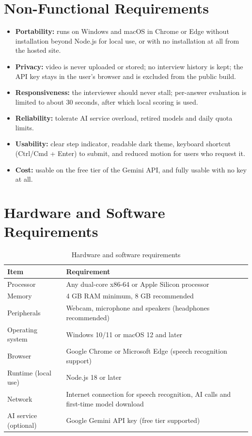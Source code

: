 \documentclass[12pt,a4paper,oneside]{report}
\begin{document}
\section{Non-Functional Requirements}
\begin{itemize}
  \item \textbf{Portability:} runs on Windows and macOS in Chrome or Edge without installation beyond Node.js for local use, or with no installation at all from the hosted site.
  \item \textbf{Privacy:} video is never uploaded or stored; no interview history is kept; the API key stays in the user's browser and is excluded from the public build.
  \item \textbf{Responsiveness:} the interviewer should never stall; per-answer evaluation is limited to about 30 seconds, after which local scoring is used.
  \item \textbf{Reliability:} tolerate AI service overload, retired models and daily quota limits.
  \item \textbf{Usability:} clear step indicator, readable dark theme, keyboard shortcut (Ctrl/Cmd + Enter) to submit, and reduced motion for users who request it.
  \item \textbf{Cost:} usable on the free tier of the Gemini API, and fully usable with no key at all.
\end{itemize}

\section{Hardware and Software Requirements}
\begin{table}[H]
\centering
\caption{Hardware and software requirements}
\label{tab:hwsw}
\small
\begin{tabularx}{\textwidth}{@{}lY@{}}
\toprule
\textbf{Item} & \textbf{Requirement} \\
\midrule
Processor & Any dual-core x86-64 or Apple Silicon processor \\
Memory & 4 GB RAM minimum, 8 GB recommended \\
Peripherals & Webcam, microphone and speakers (headphones recommended) \\
Operating system & Windows 10/11 or macOS 12 and later \\
Browser & Google Chrome or Microsoft Edge (speech recognition support) \\
Runtime (local use) & Node.js 18 or later \\
Network & Internet connection for speech recognition, AI calls and first-time model download \\
AI service (optional) & Google Gemini API key (free tier supported) \\
\bottomrule
\end{tabularx}
\end{table}
\end{document}
